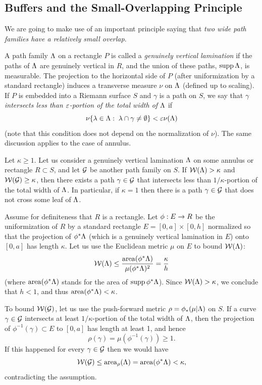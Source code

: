 \subsection{Buffers and the Small-Overlapping Principle}\label{so principle}

We are going to make  use of an important principle saying that 
{\it two wide path families have a relatively small overlap}.

A path family ${\Lambda}$ on a rectangle $P$ is called a {\it genuinely vertical lamination} 
if the paths of ${\Lambda}$ are genuinely vertical in  $R$, 
and the union of these paths, $\operatorname{supp}{\Lambda}$, is measurable.
The projection to the horizontal side of $P$ (after uniformization by a standard rectangle)
induces a transverse measure $\nu$ on ${\Lambda}$ (defined up to scaling).
If $P$ is embedded into a Riemann surface $S$  and $\gamma$ is a path on $S$, 
we say that  $\gamma$  {\it intersects less than ${\varepsilon}$-portion of the total width of ${\Lambda}$} if
$$
   \nu \{ {\lambda}\in{\Lambda} :\; {\lambda}\cap \gamma \not=\emptyset\} < {\varepsilon} \nu ({\Lambda})
$$
(note that this condition does not depend on the normalization of $\nu$).
The same discussion applies to the case of annulus. 

\begin{lem}\label{small overlap}
  Let $\kappa\geq 1$. 
 Let us consider a genuinely vertical lamination ${\Lambda}$  on some annulus or rectangle $R\subset S$,
and let  ${\cal G}$ be another path family  on $S$. If ${\cal W}({\Lambda})> \kappa$ and ${\cal W}({\cal G}) \geq  \kappa$,
then there exists a path $\gamma\in {\cal G}$ that intersects less than $1/\kappa$-portion of the
total width of ${\Lambda}$.
In particular, if $\kappa=1$ then there is a path $\gamma\in {\cal G}$ that does not cross
some leaf of ${\Lambda}$.
\end{lem}

\begin{pf}
  Assume for definiteness that $R$ is a rectangle.
Let $\phi: E \rightarrow R$ be the uniformization of $R$ 
 by a standard  rectangle $E = [0,a]\times [0,h]$ normalized so that
the projection of $\phi^* {\Lambda}$ (which is a genuinely vertical lamination in $E$)
onto $[0,a]$ has length $\kappa$. 
Let us use the Euclidean metric $\mu$  on $E$ to bound ${\cal W}({\Lambda})$:
$$
    {\cal W}({\Lambda})\leq \frac{\operatorname{area} (\phi^* {\Lambda})} {\mu(\phi^* {\Lambda})^2}=\frac{\kappa}{h}
$$
(where $\operatorname{area} (\phi^* {\Lambda})$ stands for the area of $\operatorname{supp} \phi^*{\Lambda}$). 
Since ${\cal W}({\Lambda}) > \kappa$,
we conclude that $h < 1$, and thus $\operatorname{area}(\phi^*{\Lambda}) <  \kappa$. 


To bound ${\cal W}({\cal G})$, let us  use the push-forward metric $\rho=\phi_*(\mu|{\Lambda})$ on $S$.
If a curve  $\gamma\in {\cal G}$ 
intersects at least $1/\kappa$-portion of the total width of ${\Lambda}$, then 
the projection of $\phi^{-1}(\gamma)\subset E$ to $[0,a]$ has length at least 1, and hence 
 $$
     \rho(\gamma)= \mu(\phi^{-1}(\gamma)) \geq 1.
$$
If this happened for every $\gamma\in {\cal G}$ then we would have 
$$
          {\cal W}({\cal G}) \leq \operatorname{area}_\rho ({\Lambda}) = \operatorname{area}(\phi^* {\Lambda}) < \kappa  ,
$$
  contradicting the assumption.   
\end{pf}

